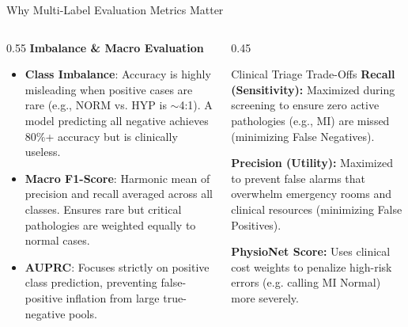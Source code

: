 \documentclass[11pt,aspectratio=169]{beamer}
\begin{document}
\begin{frame}{Why Multi-Label Evaluation Metrics Matter}
    \begin{columns}[T]
        \begin{column}{0.55\textwidth}
            \textbf{Imbalance \& Macro Evaluation}
            \begin{itemize}
                \item \textbf{Class Imbalance}: Accuracy is highly misleading when positive cases are rare (e.g., NORM vs. HYP is $\sim$4:1). A model predicting all negative achieves 80\%+ accuracy but is clinically useless.
                \item \textbf{Macro F1-Score}: Harmonic mean of precision and recall averaged across all classes. Ensures rare but critical pathologies are weighted equally to normal cases.
                \item \textbf{AUPRC}: Focuses strictly on positive class prediction, preventing false-positive inflation from large true-negative pools.
            \end{itemize}
        \end{column}
        \begin{column}{0.45\textwidth}
            \begin{block}{Clinical Triage Trade-Offs}
                \fontsize{8.5}{10}\selectfont
                \textbf{Recall (Sensitivity):} Maximized during screening to ensure zero active pathologies (e.g., MI) are missed (minimizing False Negatives).
                \vspace{0.15cm}
                
                \textbf{Precision (Utility):} Maximized to prevent false alarms that overwhelm emergency rooms and clinical resources (minimizing False Positives).
                \vspace{0.15cm}
                
                \textbf{PhysioNet Score:} Uses clinical cost weights to penalize high-risk errors (e.g. calling MI Normal) more severely.
            \end{block}
        \end{column}
    \end{columns}
\end{frame}

\end{document}
